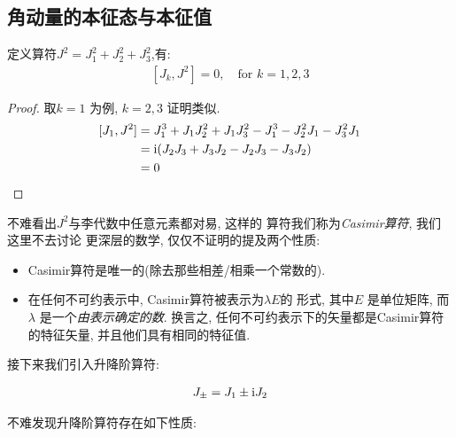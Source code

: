 \subsection{角动量的本征态与本征值}

\begin{theorem}
  定义算符$J^{2} = J_1^{2} + J_2^{2} + J_3^{2}$,有:
  \begin{equation}
    \begin{aligned}
      [J_{k}, J^{2}] = 0,\quad \text{for } k=1,2,3
    \end{aligned}
  \end{equation}
\end{theorem}
\begin{proof}
  取$k=1$ 为例, $k=2,3$ 证明类似.
  \begin{equation}
    \begin{aligned}
      [J_{1}, J^{2}] &= J_1^{3} + J_1 J_2^{2} + J_1 J_3^{2} - J_1^{3} - J_2^{2} J_1 - J_3^{2}J_1\\
        &= {\rm i}(J_2 J_3 + J_3 J_2 - J_2 J_3 - J_3 J_2) \\
        &=0
    \end{aligned}
  \end{equation}
\end{proof}

\begin{remark}
  不难看出$J^{2}$与李代数中任意元素都对易, 这样的
  算符我们称为\emph{Casimir算符}, 我们这里不去讨论
  更深层的数学, 仅仅不证明的提及两个性质:
  \begin{itemize}
    \item Casimir算符是唯一的(除去那些相差/相乘一个常数的).
    \item 在任何不可约表示中, Casimir算符被表示为$\lambda E$的
      形式, 其中$E$ 是单位矩阵, 而$\lambda$ 是一个\emph{由表示确定的数}.
      换言之, 任何不可约表示下的矢量都是Casimir算符的特征矢量,
      并且他们具有相同的特征值.
  \end{itemize}
\end{remark}

接下来我们引入升降阶算符:

\begin{equation}
  \begin{aligned}
    J_{\pm} = J_1 \pm {\rm i} J_2
  \end{aligned}
\end{equation}

不难发现升降阶算符存在如下性质:

